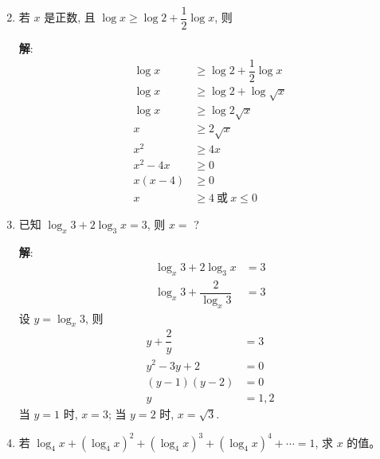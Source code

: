 \documentclass{report}
\newcommand{\sol}{\vspace{0.2cm}\textbf{解}:}
\begin{document}
\begin{multicols*}{2}
    \begin{enumerate}[leftmargin=*]
        \setcounter{enumi}{1}
        \item 若 $x$ 是正数, 且 $\log x \geq \log 2+\dfrac{1}{2} \log x$, 则

              \sol{}
              \begin{align*}
                  \log x   & \geq \log 2 + \dfrac{1}{2} \log x \\
                  \log x   & \geq \log 2 + \log \sqrt{x}       \\
                  \log x   & \geq \log 2 \sqrt{x}              \\
                  x        & \geq 2 \sqrt{x}                   \\
                  x^2      & \geq 4x                           \\
                  x^2 - 4x & \geq 0                            \\
                  x(x - 4) & \geq 0                            \\
                  x        & \geq 4\ \text{或}\ x \leq 0
              \end{align*}

              \newpage
        \item 已知 $\log _x 3+2 \log _3 x=3$, 则 $x=$ ?

              \sol{}
              \begin{align*}
                  \log_x 3 + 2 \log_3 x          & = 3 \\
                  \log_x 3 + \dfrac{2}{\log_x 3} & = 3
              \end{align*}
              设 $y = \log_x 3$, 则
              \begin{align*}
                  y + \dfrac{2}{y} & = 3    \\
                  y^2 - 3y + 2     & = 0    \\
                  (y - 1)(y - 2)   & = 0    \\
                  y                & = 1, 2
              \end{align*}
              当 $y = 1$ 时, $x = 3$; 当 $y = 2$ 时, $x = \sqrt{3}$.

        \item 若 $\log _4 x+\left(\log _4 x\right)^2+\left(\log _4 x\right)^3+\left(\log _4 x\right)^4+\cdots=1$, 求 $x$ 的值。


\end{enumerate}
\end{multicols*}
\end{document}
